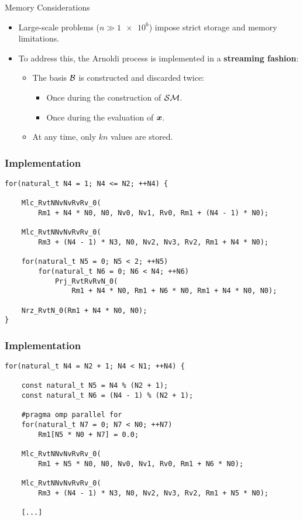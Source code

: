 \begin{frame}{Memory Considerations}
    \begin{itemize}
        \item Large-scale problems ($n \gg \num{1e6}$) impose strict storage and memory limitations.
        \item To address this, the Arnoldi process is implemented in a \textbf{streaming fashion}:
        \begin{itemize}
            \item The basis $\mathcal{B}$ is constructed and discarded twice:
            \begin{itemize}
                \item Once during the construction of $\mathcal{S} \mathcal{M}$.
                \item Once during the evaluation of $\bm{x}$.
            \end{itemize}
            \item At any time, only $k n$ values are stored.
        \end{itemize}
    \end{itemize}
\end{frame}

\begin{frame}[fragile] %
    \frametitle{Implementation}

\begin{lstlisting}[style=cpp]
for(natural_t N4 = 1; N4 <= N2; ++N4) {

    Mlc_RvtNNvNvRvRv_0(
        Rm1 + N4 * N0, N0, Nv0, Nv1, Rv0, Rm1 + (N4 - 1) * N0);

    Mlc_RvtNNvNvRvRv_0(
        Rm3 + (N4 - 1) * N3, N0, Nv2, Nv3, Rv2, Rm1 + N4 * N0);

    for(natural_t N5 = 0; N5 < 2; ++N5)
        for(natural_t N6 = 0; N6 < N4; ++N6)
            Prj_RvtRvRvN_0(
                Rm1 + N4 * N0, Rm1 + N6 * N0, Rm1 + N4 * N0, N0);

    Nrz_RvtN_0(Rm1 + N4 * N0, N0);
}
\end{lstlisting}

\end{frame}

\begin{frame}[fragile] %
    \frametitle{Implementation}

\begin{lstlisting}[style=cpp]
for(natural_t N4 = N2 + 1; N4 < N1; ++N4) {

    const natural_t N5 = N4 % (N2 + 1);
    const natural_t N6 = (N4 - 1) % (N2 + 1);

    #pragma omp parallel for
    for(natural_t N7 = 0; N7 < N0; ++N7)
        Rm1[N5 * N0 + N7] = 0.0;

    Mlc_RvtNNvNvRvRv_0(
        Rm1 + N5 * N0, N0, Nv0, Nv1, Rv0, Rm1 + N6 * N0);

    Mlc_RvtNNvNvRvRv_0(
        Rm3 + (N4 - 1) * N3, N0, Nv2, Nv3, Rv2, Rm1 + N5 * N0);

    [...]
\end{lstlisting}

\end{frame}


